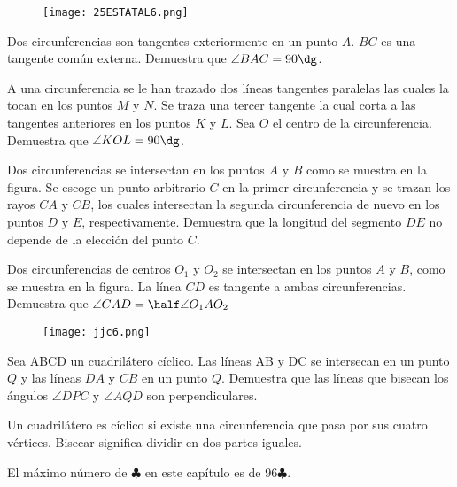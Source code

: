 \begin{figure}[!h]
    \centering
    \texttt{[image: 25ESTATAL6.png]}
\end{figure}

\begin{problem}[$4 \clubsuit$]
    Dos circunferencias son tangentes exteriormente en un punto
    $A$. $BC$ es una tangente común externa. 
    Demuestra que $\angle BAC = 90 \dg$.
\end{problem}

\begin{problem}[$5 \clubsuit$]
    A una circunferencia se le han trazado dos líneas tangentes
    paralelas las cuales la tocan en los puntos $M$ y $N$. 
    Se traza una tercer tangente la cual corta a las tangentes 
    anteriores en los puntos $K$ y $L$. Sea $O$ el centro de la 
    circunferencia. Demuestra que $\angle KOL = 90\dg $.
\end{problem}

\begin{problem}[$6 \clubsuit$]
    Dos circunferencias se intersectan en los puntos $A$ y $B$ 
    como se muestra en la figura. Se escoge un punto arbitrario 
    $C$ en la primer circunferencia y se trazan los rayos $CA$ 
    y $CB$, los cuales intersectan la segunda circunferencia
    de nuevo en los puntos $D$ y $E$, respectivamente. Demuestra 
    que la longitud del segmento $DE$ no depende de la elección 
    del punto $C$.
\end{problem}

\begin{problem}[$4 \clubsuit$]
    Dos circunferencias de centros $O_1$ y $O_2$ se intersectan 
    en los puntos $A$ y $B$, como se muestra en la figura. La 
    línea $CD$ es tangente a ambas circunferencias. Demuestra que
    $\angle CAD = \half \angle O_1AO_2$
\end{problem}

\begin{figure}[!h]
    \centering
    \texttt{[image: jjc6.png]}
\end{figure}

\begin{problem}[$7 \clubsuit$]
    Sea ABCD un cuadrilátero cíclico. Las líneas AB y DC se 
    intersecan en un punto $Q$ y las líneas $DA$ y $CB$ en 
    un punto $Q$. Demuestra que las líneas que bisecan los 
    ángulos $\angle DPC$ y $\angle AQD$ son perpendiculares.
\end{problem}

\begin{remark}
    Un cuadrilátero es cíclico si existe una circunferencia que 
    pasa por sus cuatro vértices. Bisecar significa dividir 
    en dos partes iguales.
\end{remark}

\noindent El máximo número de $\clubsuit$ en este capítulo es de 
$96 \clubsuit$.
